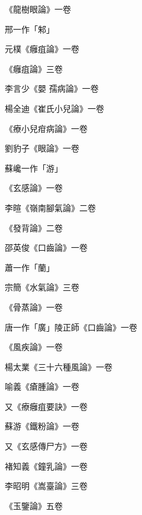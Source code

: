 \begin{pinyinscope}
 《龍樹眼論》一卷



 邢一作「邾」



 元樸《癰疽論》一卷



 《癰疽論》三卷



 李言少《嬰
 孺病論》一卷



 楊全迪《崔氏小兒論》一卷



 《療小兒疳病論》一卷



 劉豹子《眼論》一卷



 蘇巉一作「游」



 《玄感論》一卷



 李暄《嶺南腳氣論》二卷



 《發背論》二卷



 邵英俊《口齒論》一卷



 蕭一作「蘭」



 宗簡《水氣論》三卷



 《骨蒸論》一卷



 唐一作「廣」陵正師《口齒論》一卷



 《風疾論》一卷



 楊太業《三十六種風論》一卷



 喻義《瘡腫論》一卷



 又《療癰疽要訣》一卷



 蘇游《鐵粉論》一卷



 又《玄感傳尸方》一卷



 褚知義《鐘乳論》一卷



 李昭明《嵩臺論》三卷



 《玉鑒論》五卷




\end{pinyinscope}
